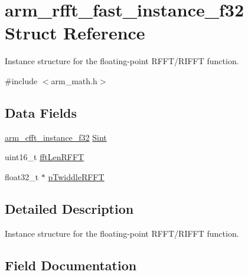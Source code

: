 \hypertarget{structarm__rfft__fast__instance__f32}{}\section{arm\+\_\+rfft\+\_\+fast\+\_\+instance\+\_\+f32 Struct Reference}
\label{structarm__rfft__fast__instance__f32}


Instance structure for the floating-\/point R\+F\+F\+T/\+R\+I\+F\+FT function.  




{\ttfamily \#include $<$arm\+\_\+math.\+h$>$}

\subsection*{Data Fields}
\begin{DoxyCompactItemize}
\item 
\hyperlink{structarm__cfft__instance__f32}{arm\+\_\+cfft\+\_\+instance\+\_\+f32} \hyperlink{structarm__rfft__fast__instance__f32_aa8a05a9fabc3852e5d476152a5067e53}{Sint}
\item 
uint16\+\_\+t \hyperlink{structarm__rfft__fast__instance__f32_a174f8c72d545034e19ba4ced52b31353}{fft\+Len\+R\+F\+FT}
\item 
float32\+\_\+t $\ast$ \hyperlink{structarm__rfft__fast__instance__f32_a43370fe848d06993faf834da07ca91ce}{p\+Twiddle\+R\+F\+FT}
\end{DoxyCompactItemize}


\subsection{Detailed Description}
Instance structure for the floating-\/point R\+F\+F\+T/\+R\+I\+F\+FT function. 

\subsection{Field Documentation}
\mbox{\label{structarm__rfft__fast__instance__f32_a174f8c72d545034e19ba4ced52b31353}} 
